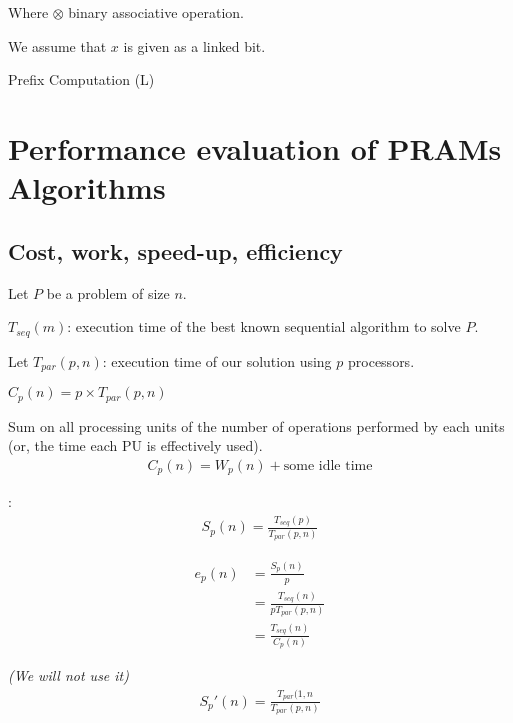 Where $\otimes$ binary associative operation.

We assume that $x$ is given as a linked bit.

\begin{algorithm}[H]
\While{there exists a node i such that next[i]!=nil}{
	\For{all i in parallel}{
		\If{next[i]!=nil}{
			y[next[i]]$\leftarrow$ y[i] $\otimes$ y[next[i]]\\
			next[i] $\leftarrow$ next[next[i]]]\\
		}
	}
}
\caption{Prefix Computation (L)}
\end{algorithm}


\section{Performance evaluation of PRAMs Algorithms}
\subsection{Cost, work, speed-up, efficiency}
Let $P$ be a problem of size $n$.

$T_{seq}(m)$: execution time of the best known sequential algorithm to solve $P$.

Let $T_{par}(p,n)$: execution time of our solution using $p$ processors.

 $C_p(n)=p\times T_{par}(p,n)$

 Sum on all processing units 
of the number of operations performed by each units (or, the time each PU is effectively used).
\begin{align*}
C_p(n)=W_p(n)+\text{some idle time}
\end{align*}

:
\begin{align*}
S_p(n)=\frac{T_{seq}(p)}{T_{par}(p,n)}
\end{align*}

\begin{align*}
e_p(n) & =\frac{S_p(n)}{p}\\
& = \frac{T_{seq}(n)}{pT_{par}(p,n)}\\
& = \frac{T_{seq}(n)}{C_p(n)}
\end{align*}

 \textit{(We will not use it)}
\begin{align*}
S_p'(n)=\frac{T_{par}(1,n}{T_{par}(p,n)}
\end{align*}

